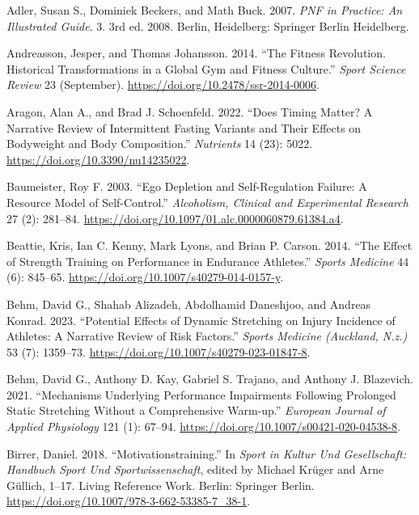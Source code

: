 \documentclass[
  letterpaper,
  DIV=11,
  numbers=noendperiod]{scrreprt}
\newlength{\cslhangindent}
\newenvironment{CSLReferences}[2] %
 {\begin{list}{}{%
  \setlength{\itemindent}{0pt}
  \setlength{\leftmargin}{0pt}
  \setlength{\parsep}{0pt}
  \ifodd #1
   \setlength{\leftmargin}{\cslhangindent}
   \setlength{\itemindent}{-1\cslhangindent}
  \fi
  \setlength{\itemsep}{#2\baselineskip}}}
 {\end{list}}
\begin{document}
\label{refs}
\begin{CSLReferences}{1}{0}
Adler, Susan S., Dominiek Beckers, and Math Buck. 2007. \emph{{PNF} in
{Practice}: {An Illustrated Guide}}. 3. 3rd ed. 2008. Berlin,
Heidelberg: Springer Berlin Heidelberg.

Andreasson, Jesper, and Thomas Johansson. 2014. {``The Fitness
Revolution. {Historical} Transformations in a Global Gym and Fitness
Culture.''} \emph{Sport Science Review} 23 (September).
\url{https://doi.org/10.2478/ssr-2014-0006}.

Aragon, Alan A., and Brad J. Schoenfeld. 2022. {``Does {Timing Matter}?
{A Narrative Review} of {Intermittent Fasting Variants} and {Their
Effects} on {Bodyweight} and {Body Composition}.''} \emph{Nutrients} 14
(23): 5022. \url{https://doi.org/10.3390/nu14235022}.

Baumeister, Roy F. 2003. {``Ego Depletion and Self-Regulation Failure: A
Resource Model of Self-Control.''} \emph{Alcoholism, Clinical and
Experimental Research} 27 (2): 281--84.
\url{https://doi.org/10.1097/01.alc.0000060879.61384.a4}.

Beattie, Kris, Ian C. Kenny, Mark Lyons, and Brian P. Carson. 2014.
{``The {Effect} of {Strength Training} on {Performance} in {Endurance
Athletes}.''} \emph{Sports Medicine} 44 (6): 845--65.
\url{https://doi.org/10.1007/s40279-014-0157-y}.

Behm, David G., Shahab Alizadeh, Abdolhamid Daneshjoo, and Andreas
Konrad. 2023. {``Potential {Effects} of {Dynamic Stretching} on {Injury
Incidence} of {Athletes}: {A Narrative Review} of {Risk Factors}.''}
\emph{Sports Medicine (Auckland, N.z.)} 53 (7): 1359--73.
\url{https://doi.org/10.1007/s40279-023-01847-8}.

Behm, David G., Anthony D. Kay, Gabriel S. Trajano, and Anthony J.
Blazevich. 2021. {``Mechanisms Underlying Performance Impairments
Following Prolonged Static Stretching Without a Comprehensive
Warm-up.''} \emph{European Journal of Applied Physiology} 121 (1):
67--94. \url{https://doi.org/10.1007/s00421-020-04538-8}.

Birrer, Daniel. 2018. {``Motivationstraining.''} In \emph{Sport in
{Kultur} Und {Gesellschaft}: {Handbuch Sport} Und {Sportwissenschaft}},
edited by Michael Krüger and Arne Güllich, 1--17. Living Reference Work.
Berlin: Springer Berlin.
\url{https://doi.org/10.1007/978-3-662-53385-7_38-1}.


\end{CSLReferences}
\end{document}
